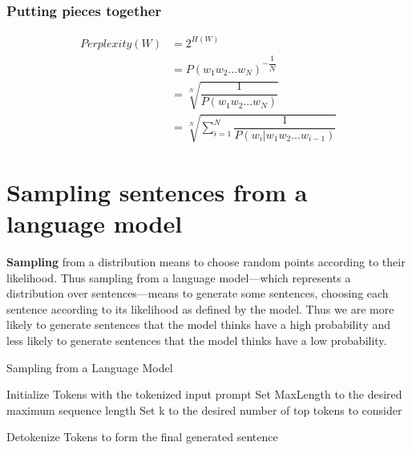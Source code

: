 \subsubsection*{Putting pieces together}
\[
\begin{aligned}
    Perplexity(W)       
        &= 2^{H(W)}    \\ 
        &= P(w_1w_2...w_N)^{-\dfrac{1}{N}} \\ 
        &= \sqrt[N]{\dfrac{1}{P(w_1w_2...w_N)}} \\ 
        &= \sqrt[N]{\sum_{i=1}^{N} \dfrac{1}{P(w_i|w_1w_2...w_{i-1})}} 
\end{aligned}
\]





\section{Sampling sentences from a language model \cite{nlp-1}}

\textbf{Sampling} from a distribution means to choose random points according to their likelihood. Thus sampling from a language model—which represents a distribution over sentences—means to generate some sentences, choosing each sentence according to its likelihood as defined by the model. Thus we are more likely to generate sentences that the model thinks have a high probability and less likely to generate sentences that the model thinks have a low probability.

\begin{algorithm}
    \caption{Sampling from a Language Model}
    Initialize Tokens with the tokenized input prompt\;
    Set MaxLength to the desired maximum sequence length\;
    Set k to the desired number of top tokens to consider\;
    
    
    Detokenize Tokens to form the final generated sentence\;
\end{algorithm}


